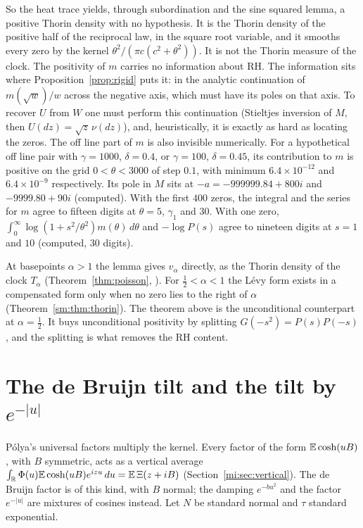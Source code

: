 So the heat trace yields, through subordination and the sine squared lemma, a positive Thorin density with no hypothesis. It is the Thorin density of the positive half of the reciprocal law, in the square root variable, and it smooths every zero by the kernel $\theta^2/(\pi c(c^2+\theta^2))$. It is not the Thorin measure of the clock. The positivity of $m$ carries no information about RH. The information sits where Proposition~\ref{prop:rigid} puts it: in the analytic continuation of $m(\sqrt w)/w$ across the negative axis, which must have its poles on that axis. To recover $U$ from $W$ one must perform this continuation (Stieltjes inversion of $M$, then $U(dz)=\sqrt z\,\nu(dz)$), and, heuristically, it is exactly as hard as locating the zeros. The off line part of $m$ is also invisible numerically. For a hypothetical off line pair with $\gamma=1000$, $\delta=0.4$, or $\gamma=100$, $\delta=0.45$, its contribution to $m$ is positive on the grid $0<\theta<3000$ of step $0.1$, with minimum $6.4\times10^{-12}$ and $6.4\times10^{-9}$ respectively. Its pole in $M$ sits at $-a=-999999.84+800i$ and $-9999.80+90i$ (computed). With the first $400$ zeros, the integral and the series for $m$ agree to fifteen digits at $\theta=5$, $\gamma_1$ and $30$. With one zero, $\int_0^\infty\log(1+s^2/\theta^2)m(\theta)\,d\theta$ and $-\log P(s)$ agree to nineteen digits at $s=1$ and $10$ (computed, $30$ digits).

\begin{remark}\label{riemanncont:rem:sin2basepoint}
At basepoints $\alpha>1$ the lemma gives $v_\alpha$ directly, as the Thorin density of the clock $T_\alpha$ (Theorem~\ref{thm:poisson}, \cite[Theorem 8.2]{P17}). For $\frac12<\alpha<1$ the L\'evy form exists in a compensated form only when no zero lies to the right of $\alpha$ (Theorem~\ref{sm:thm:thorin}). The theorem above is the unconditional counterpart at $\alpha=\frac12$. It buys unconditional positivity by splitting $G(-s^2)=P(s)P(-s)$, and the splitting is what removes the RH content.
\end{remark}

\section{The de Bruijn tilt and the tilt by \texorpdfstring{$e^{-|u|}$}{exp(-|u|)}}\label{riemanncont:sec:tilt}

P\'olya's universal factors multiply the kernel. Every factor of the form $\mathbb{E}\cosh(uB)$, with $B$ symmetric, acts as a vertical average $\int_{\mathbb{R}}\Phi(u)\mathbb{E}\cosh(uB)e^{izu}\,du=\mathbb{E}\,\Xi(z+iB)$ (Section~\ref{mi:sec:vertical}). The de Bruijn factor is of this kind, with $B$ normal; the damping $e^{-bu^2}$ and the factor $e^{-|u|}$ are mixtures of cosines instead. Let $N$ be standard normal and $\tau$ standard exponential.

